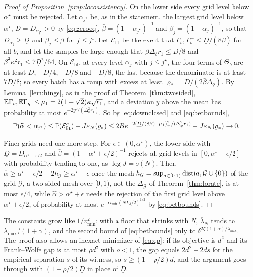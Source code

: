 \begin{proof}[Proof of Proposition~\ref{prop:loconsistency}]
On the lower side every grid level below $\alpha^\star$ must be rejected. Let $\alpha_{j^\star}$ be, as in the
statement, the largest grid level below $\alpha^\star$, $\underline D=D_{\alpha_{j^\star}}>0$ by \eqref{eq:zeroeq}, $\bar\beta=(1-\alpha_{j^\star})^{-1}$ and
$\beta_j=(1-\alpha_j)^{-1}$, so that $D_{\alpha_j}\ge \underline D$ and $\beta_j\le\bar\beta$ for $j\le j^\star$. Let $\mathcal E_{\mathrm{fit}}$ be the
event that $\Gamma_b,\Gamma_b^-\le \underline D/(8\bar\beta)$ for all $b$, and let the samples be large enough
that $\bar\beta\Delta_\phi r_1\le \underline D/8$ and $\bar\beta^2\kappa^2r_1\le7\underline D^2/64$. On
$\mathcal E_{\mathrm{fit}}$, at every level $\alpha_j$ with $j\le j^\star$, the four terms of $\Theta_b$ are at least
$\underline D$, $-\underline D/4$, $-\underline D/8$ and $-\underline D/8$, the last because the denominator is at
least $7\underline D/8$; so every batch has a ramp with excess at least $\varrho_*=\underline D/(2\bar\beta\Delta_\phi)$.
By Lemma~\ref{lem:hinge}, as in the proof of Theorem~\ref{thm:twosided},
$\mathbb{E}\Gamma_b,\mathbb{E}\Gamma_b^-\le\mu_1=2(1+\sqrt2)\kappa\sqrt{r_1}$, and a deviation $y$ above the mean has probability
at most $e^{-2y^2/(\Delta_\phi^2r_1)}$. So by \eqref{eq:downclosed} and \eqref{eq:betbounds},
\[
\mathbb{P}(\widehat\alpha<\alpha_{j^\star})\le\mathbb{P}(\mathcal E_{\mathrm{fit}}^c)+J\varepsilon_N(\varrho_*)\le
2Be^{-2(\underline D/(8\bar\beta)-\mu_1)_+^2/(\Delta_\phi^2r_1)}+J\varepsilon_N(\varrho_*)\to0 .
\]

Finer grids need one more step. For $\epsilon\in(0,\alpha^\star)$, the lower side with
$\underline D=D_{\alpha^\star-\epsilon/2}$ and $\bar\beta=(1-\alpha^\star+\epsilon/2)^{-1}$ rejects all grid levels in
$[0,\alpha^\star-\epsilon/2]$ with probability tending to one, as $\log J=o(N)$. Then
$\widehat\alpha\ge\alpha^\star-\epsilon/2-2h_{\mathcal G}\ge\alpha^\star-\epsilon$ once the mesh
$h_{\mathcal G}=\sup_{a\in[0,1)}\operatorname{dist}(a,\mathcal G\cup\{0\})$ of the grid $\mathcal G$, a two-sided mesh over $[0,1)$,
not the $\Delta_{\mathcal G}$ of Theorem~\ref{thm:lorate}, is at most $\epsilon/4$, while
$\widehat\alpha>\alpha^\star+\epsilon$ needs the rejection of the first grid level above $\alpha^\star+\epsilon/2$, of
probability at most $e^{-\epsilon v_{\min}(NL_\delta/2)^{1/2}}$ by \eqref{eq:betbounds}.
\end{proof}

The constants grow like $1/v^2_{\min}$: with a floor that shrinks with $N$, $\overline\lambda_N$ tends to
$\lambda_{\max}/(1+\alpha)$, and the second bound of \eqref{eq:betbounds} only to
$\delta^{2\zeta(1+\alpha)/\lambda_{\max}}$. The proof also allows an inexact minimizer of \eqref{eq:qp}: if its
objective is $d^2$ and its Frank--Wolfe gap is at most $\rho d^2$ with $\rho<1$, the gap equals $2d^2-2ds$ for the
empirical separation $s$ of its witness, so $s\ge(1-\rho/2)d$, and the argument goes through with
$(1-\rho/2)\underline D$ in place of $\underline D$.

